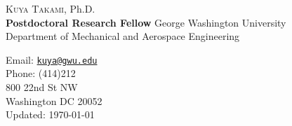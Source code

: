 \documentclass[10pt,letterpaper]{article}
\begin{document}
  \thispagestyle{noheader}
  \begin{minipage}{0.7\linewidth}
  {\vspace{1cm}\selectfont \Huge {\scshape Kuya Takami}, Ph.D.}\\
\vspace{5mm}
{\bf Postdoctoral Research Fellow} \quad George Washington University\\
Department of Mechanical and Aerospace Engineering\\

  \end{minipage}
  \hspace{2mm}
  \begin{minipage}{0.6\linewidth}
    \vspace{5mm}
  	Email:  \href{mailto:kuya@gwu.edu}{\tt kuya@gwu.edu} \\
    Phone:  (414)212\\

    800 22nd St NW\\
    Washington DC 20052\\
    \vspace{5pt}
    Updated: \today
  \end{minipage}

\vspace{5mm}

\end{document}
